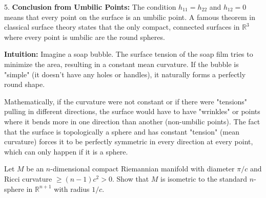 \begin{solution}
5. \textbf{Conclusion from Umbilic Points:}
The condition $h_{11} = h_{22}$ and $h_{12} = 0$ means that every point on the surface is an umbilic point. A famous theorem in classical surface theory states that the only compact, connected surfaces in $\mathbb{R}^3$ where every point is umbilic are the round spheres.
\par\vspace{\baselineskip}

\textbf{Intuition:}
Imagine a soap bubble. The surface tension of the soap film tries to minimize the area, resulting in a constant mean curvature. If the bubble is "simple" (it doesn't have any holes or handles), it naturally forms a perfectly round shape.
\par\vspace{\baselineskip}

Mathematically, if the curvature were not constant or if there were "tensions" pulling in different directions, the surface would have to have "wrinkles" or points where it bends more in one direction than another (non-umbilic points). The fact that the surface is topologically a sphere and has constant "tension" (mean curvature) forces it to be perfectly symmetric in every direction at every point, which can only happen if it is a sphere.
\end{solution}

\begin{exercise}
\label{geometry:2015:5}
Let $M$ be an $n$-dimensional compact Riemannian manifold with diameter $\pi/c$ and Ricci curvature $\geq (n-1)c^{2} > 0$. Show that $M$ is isometric to the standard $n$-sphere in $\mathbb{R}^{n+1}$ with radius $1/c$.
\end{exercise}

